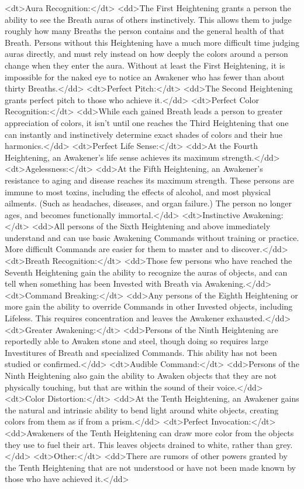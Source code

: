 <dt>Aura Recognition:</dt>
<dd>The First Heightening grants a person the ability to see the Breath auras of others instinctively. This allows them to judge roughly how many Breaths the person contains and the general health of that Breath. Persons without this Heightening have a much more difficult time judging auras directly, and must rely instead on how deeply the colors around a person change when they enter the aura. Without at least the First Heightening, it is impossible for the naked eye to notice an Awakener who has fewer than about thirty Breaths.</dd>
<dt>Perfect Pitch:</dt>
<dd>The Second Heightening grants perfect pitch to those who achieve it.</dd>
<dt>Perfect Color Recognition:</dt>
<dd>While each gained Breath leads a person to greater appreciation of colors, it isn’t until one reaches the Third Heightening that one can instantly and instinctively determine exact shades of colors and their hue harmonics.</dd>
<dt>Perfect Life Sense:</dt>
<dd>At the Fourth Heightening, an Awakener’s life sense achieves its maximum strength.</dd>
<dt>Agelessness:</dt>
<dd>At the Fifth Heightening, an Awakener’s resistance to aging and disease reaches its maximum strength. These persons are immune to most toxins, including the effects of alcohol, and most physical ailments. (Such as headaches, diseases, and organ failure.) The person no longer ages, and becomes functionally immortal.</dd>
<dt>Instinctive Awakening:</dt>
<dd>All persons of the Sixth Heightening and above immediately understand and can use basic Awakening Commands without training or practice. More difficult Commands are easier for them to master and to discover.</dd>
<dt>Breath Recognition:</dt>
<dd>Those few persons who have reached the Seventh Heightening gain the ability to recognize the auras of objects, and can tell when something has been Invested with Breath via Awakening.</dd>
<dt>Command Breaking:</dt>
<dd>Any persons of the Eighth Heightening or more gain the ability to override Commands in other Invested objects, including Lifeless. This requires concentration and leaves the Awakener exhausted.</dd>
<dt>Greater Awakening:</dt>
<dd>Persons of the Ninth Heightening are reportedly able to Awaken stone and steel, though doing so requires large Investitures of Breath and specialized Commands. This ability has not been studied or confirmed.</dd>
<dt>Audible Command:</dt>
<dd>Persons of the Ninth Heightening also gain the ability to Awaken objects that they are not physically touching, but that are within the sound of their voice.</dd>
<dt>Color Distortion:</dt>
<dd>At the Tenth Heightening, an Awakener gains the natural and intrinsic ability to bend light around white objects, creating colors from them as if from a prism.</dd>
<dt>Perfect Invocation:</dt>
<dd>Awakeners of the Tenth Heightening can draw more color from the objects they use to fuel their art. This leaves objects drained to white, rather than grey.</dd>
<dt>Other:</dt>
<dd>There are rumors of other powers granted by the Tenth Heightening that are not understood or have not been made known by those who have achieved it.</dd>


